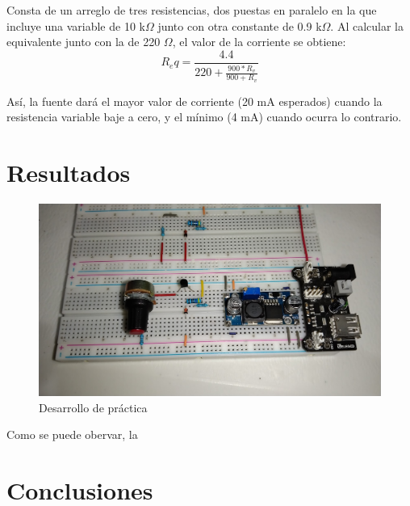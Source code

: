 \documentclass{article}
\begin{document}
Consta de un arreglo de tres resistencias, dos puestas en paralelo en la que incluye una variable de 10 k\(\Omega\) junto con
otra constante de 0.9 k\(\Omega\). Al calcular la equivalente junto con la de 220 \(\Omega\), el valor de la corriente se obtiene:
\[ R_eq = \frac{4.4}{220 + \frac{900*R_v}{900 + R_v}} \]

Así, la fuente dará el mayor valor de corriente (20 mA esperados) cuando la resistencia variable baje a cero, y el mínimo (4 mA)
cuando ocurra lo contrario.

\section{Resultados}

\begin{figure}[htb]
    \centering
    \includegraphics[scale=0.25]{IMG_20220303_191602.jpg}
    \caption{Desarrollo de práctica}
    \label{Fig: Desarrollo del ejercicios}
\end{figure}

Como se puede obervar, la 

\section{Conclusiones}
\end{document}
